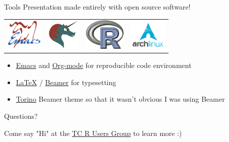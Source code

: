 \documentclass[sans,aspectratio=169,presentation,bigger,fleqn]{beamer}
\begin{document}
\begin{frame}[label=sec-36]{Tools}
Presentation made entirely with open source software!

\begin{center}
\begin{center}
\begin{tabular}{llll}
\includegraphics[height=1.5cm]{./img/emacs.png} & \includegraphics[height=1.5cm]{./img/org-mode.png} & \includegraphics[height=1.5cm]{./img/r.png} & \includegraphics[height=1.5cm]{./img/arch.png}\\
\end{tabular}
\end{center}
\end{center}

\begin{itemize}
\item \href{http://www.gnu.org/software/emacs/}{Emacs} and \href{http://orgmode.org/}{Org-mode} for reproducible code environment
\item \href{http://www.latex-project.org/}{\LaTeX} / \href{http://www.ctan.org/tex-archive/macros/latex/contrib/beamer/}{Beamer} for typesetting
\item \href{http://blog.barisione.org/2007-09/torino-a-pretty-theme-for-latex-beamer/}{Torino} Beamer theme so that it wasn't obvious I was using Beamer
\end{itemize}
\end{frame}

\begin{frame}[label=sec-37]{}
\LARGE
\begin{center}
Questions?

\vspace{1.5cm}

\normalsize
Come say "Hi" at the \href{http://www.meetup.com/twincitiesrug/}{TC R Users Group} to learn more :)
\end{center}
\end{frame}
\end{document}
